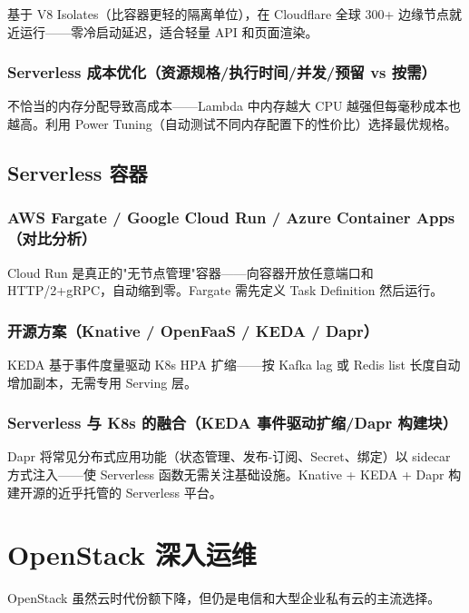 \documentclass[12pt,UTF8]{ctexbook}
\begin{document}
基于 V8 Isolates（比容器更轻的隔离单位），在 Cloudflare 全球 300+ 边缘节点就近运行——零冷启动延迟，适合轻量 API 和页面渲染。

    \subsection{Serverless 成本优化（资源规格/执行时间/并发/预留 vs 按需）}

不恰当的内存分配导致高成本——Lambda 中内存越大 CPU 越强但每毫秒成本也越高。利用 Power Tuning（自动测试不同内存配置下的性价比）选择最优规格。

  \section{Serverless 容器}
    \subsection{AWS Fargate / Google Cloud Run / Azure Container Apps（对比分析）}

Cloud Run 是真正的"无节点管理"容器——向容器开放任意端口和 HTTP/2+gRPC，自动缩到零。Fargate 需先定义 Task Definition 然后运行。

    \subsection{开源方案（Knative / OpenFaaS / KEDA / Dapr）}

KEDA 基于事件度量驱动 K8s HPA 扩缩——按 Kafka lag 或 Redis list 长度自动增加副本，无需专用 Serving 层。

    \subsection{Serverless 与 K8s 的融合（KEDA 事件驱动扩缩/Dapr 构建块）}

Dapr 将常见分布式应用功能（状态管理、发布-订阅、Secret、绑定）以 sidecar 方式注入——使 Serverless 函数无需关注基础设施。Knative + KEDA + Dapr 构建开源的近乎托管的 Serverless 平台。


\chapter{OpenStack 深入运维}
\label{chap:openstack-deep}

OpenStack 虽然云时代份额下降，但仍是电信和大型企业私有云的主流选择。
\end{document}
